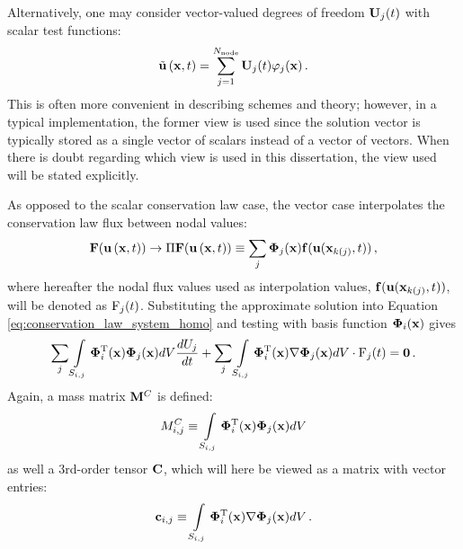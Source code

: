 \begin{remark}
Alternatively, one may consider vector-valued degrees of freedom
$\mathbf{U}_j(t)$ with scalar test functions:
\begin{equation}
  \tilde{\mathbf{u}}\left(\mathbf{x},t\right) = \sum\limits_{j=1}^{N_\text{node}}
    \mathbf{U}_j(t)\varphi_j(\mathbf{x}) \,.
\end{equation}
This is often more convenient in describing schemes and theory; however,
in a typical implementation, the former view is used since the solution
vector is typically stored as a single vector of scalars instead of a
vector of vectors. When there is doubt regarding which view is used
in this dissertation, the view used will be stated explicitly.
\end{remark}

As opposed to the scalar conservation law case, the vector case interpolates
the conservation law flux between nodal values:
\begin{equation}
  \consfluxvector(\vectorsolution\xt) \rightarrow
  \Pi\consfluxvector(\vectorsolution\xt) 
    \equiv \sumj\vectortestfunction_j(\x)\mathbf{\consfluxletter}
      (\vectorsolution(\x_{\nodeindex(j)},\timevalue))
  \eqc
\end{equation}
where hereafter the nodal flux values used as interpolation values,
$\mathbf{f}(\mathbf{u}(\mathbf{x}_{k(j)},t))$,
will be denoted as $\mathrm{F}_j(t)$.
Substituting the approximate
solution into Equation \eqref{eq:conservation_law_system_homo} and testing with basis
function $\mathbf{\Phi}_i(\mathbf{x})$ gives
\begin{equation}\label{eq:vector_weak_form_long}
   \sum\limits_j\int\limits_{S_{i,j}}\mathbf{\Phi}_i^{\text{T}}(\mathbf{x})\mathbf{\Phi}_j(\mathbf{x}) dV
     \frac{dU_j}{dt}
     + \sum\limits_j\int\limits_{S_{i,j}}\mathbf{\Phi}_i^{\text{T}}(\mathbf{x})\nabla\mathbf{\Phi}_j(\mathbf{x})
     dV\cdot\mathrm{F}_j(t) = \mathbf{0} \,.
\end{equation}
Again, a mass matrix $\mathbf{M}^C$ is defined:
\begin{equation}
  M^C_{i,j} \equiv
    \int\limits_{S_{i,j}}\mathbf{\Phi}_i^{\text{T}}(\mathbf{x})\mathbf{\Phi}_j(\mathbf{x}) dV
\end{equation}
as well a 3rd-order tensor $\gradientmatrix$, which will here be viewed as a
matrix with vector entries:
\begin{equation}
  \mathbf{c}_{i,j} \equiv
    \int\limits_{S_{i,j}}\mathbf{\Phi}_i^{\text{T}}(\mathbf{x})
      \nabla\mathbf{\Phi}_j(\mathbf{x}) dV
  \,.
\end{equation}

